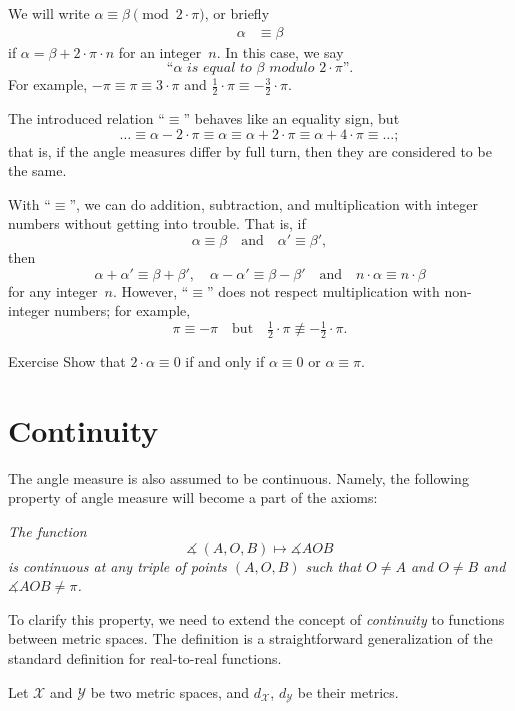 We will write $\alpha\equiv\beta\pmod{2\cdot\pi}$, or briefly
\begin{align*}
\alpha&\equiv\beta
\end{align*}
if $\alpha=\beta+2\cdot\pi\cdot n$
for an integer~$n$.
In this case, we say 
$$\textit{``$\alpha$ is equal to $\beta$ modulo $2\cdot\pi$''}.$$
For example, $-\pi
\equiv
\pi\equiv 3\cdot\pi$ and $\tfrac12\cdot\pi
\equiv
-\tfrac32\cdot\pi$.

The introduced relation ``$\equiv$'' behaves like an equality sign,
but
\[\dots\equiv\alpha-2\cdot\pi\equiv \alpha\equiv \alpha+2\cdot\pi\equiv \alpha+4\cdot\pi\equiv\dots;\] 
that is, if the angle measures differ by full turn,
then they are considered to be the same.

With ``$\equiv$'', we can do addition, subtraction, and multiplication with integer numbers without getting into trouble.
That is, if
$$\alpha\equiv\beta
\quad
\text{and}
\quad
\alpha'\equiv \beta',$$ 
then
$$\alpha+\alpha'\equiv\beta+\beta',
\quad
\alpha-\alpha'\equiv \beta-\beta'
\quad 
\text{and}
\quad
n\cdot\alpha\equiv n\cdot\beta$$
for any integer~$n$.
However, ``$\equiv$'' does not respect multiplication with non-integer numbers; for example, 
$$\pi
\equiv 
-\pi
\quad
\text{but}
\quad
\tfrac12\cdot\pi
\not\equiv
-\tfrac12\cdot\pi.$$ 

\begin{thm}{Exercise}\label{ex:2a=0}
Show that $2\cdot\alpha\equiv0$ if and only if $\alpha\equiv0$ or $\alpha\equiv\pi$.
\end{thm}

\section{Continuity}

The angle measure is also assumed to be continuous.
Namely, the following property of angle measure will become a part of the axioms:

\textit{The function}
$$\measuredangle\:(A,O,B)\mapsto\measuredangle A O B$$
\textit{is continuous at any triple of points $(A,O,B)$
such that $O\ne A$ and $O\ne B$ and $\measuredangle A O B\ne\pi$.}

To clarify this property, we need to extend the concept of {}\emph{continuity} to functions between metric spaces.
The definition is a straightforward generalization of the standard definition for real-to-real functions.

Let $\mathcal X$ and $\mathcal Y$ be two metric spaces,
and $d_{\mathcal X}$, $d_{\mathcal Y}$ be their metrics.

